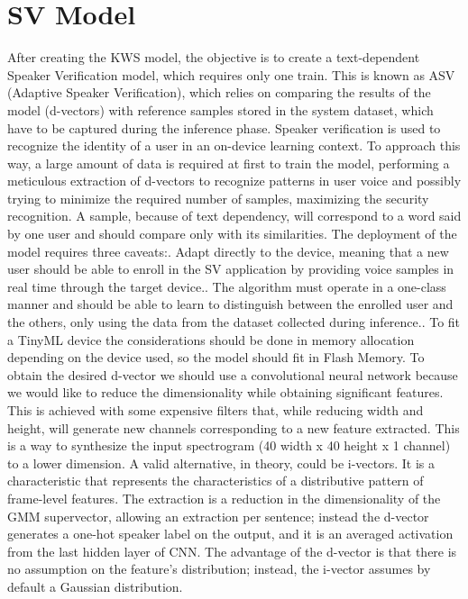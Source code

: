 \section{SV Model}
\label{sec:sv introduction}
After creating the KWS model, the objective is to create a text-dependent Speaker Verification model, which requires only one train. This is known as ASV (Adaptive Speaker Verification), which relies on comparing the results of the model (d-vectors) with reference samples stored in the system dataset, which have to be captured during the inference phase. Speaker verification is used to recognize the identity of a user in an on-device learning context. To approach this way, a large amount of data is required at first to train the model, performing a meticulous extraction of d-vectors to recognize patterns in user voice and possibly trying to minimize the required number of samples, maximizing the security recognition. A sample, because of text dependency, will correspond to a word said by one user and should compare only with its similarities.\newline
The deployment of the model requires three caveats:. Adapt directly to the device, meaning that a new user should be able to enroll in the SV application by providing voice samples in real time through the target device.. The algorithm must operate in a one-class manner and should be able to learn to distinguish between the enrolled user and the others, only using the data from the dataset collected during inference.. To fit a TinyML device the considerations should be done in memory allocation depending on the device used, so the model should fit in Flash Memory.\newline
To obtain the desired d-vector we should use a convolutional neural network because we would like to reduce the dimensionality while obtaining significant features. This is achieved with some expensive filters that, while reducing width and height, will generate new channels corresponding to a new feature extracted. This is a way to synthesize the input spectrogram (40 width x 40 height x 1 channel) to a lower dimension.\newline
A valid alternative, in theory, could be i-vectors. It is a characteristic that represents the characteristics of a distributive pattern of frame-level features. The extraction is a reduction in the dimensionality of the GMM supervector\cite{dvector_extractor_TinySV}, allowing an extraction per sentence; instead the d-vector generates a one-hot speaker label on the output, and it is an averaged activation from the last hidden layer of CNN. The advantage of the d-vector is that there is no assumption on the feature's distribution; instead, the i-vector assumes by default a Gaussian distribution.
